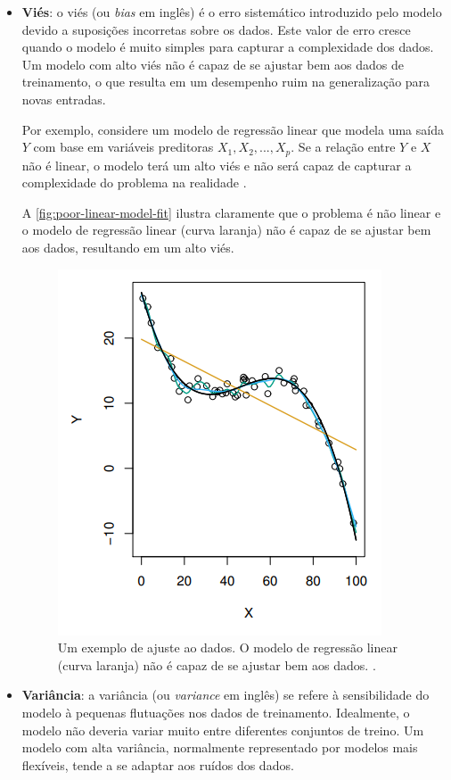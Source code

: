\begin{itemize}
    \item \textbf{Viés}: o viés (ou \textit{bias} em inglês) é o erro sistemático introduzido pelo modelo devido a suposições incorretas sobre os dados. Este valor de erro cresce quando o modelo é muito simples para capturar a complexidade dos dados. Um modelo com alto viés não é capaz de se ajustar bem aos dados de treinamento, o que resulta em um desempenho ruim na generalização para novas entradas.
    
    Por exemplo, considere um modelo de regressão linear que modela uma saída $Y$ com base em variáveis preditoras $X_1, X_2, ..., X_p$. Se a relação entre $Y$ e $X$ não é linear, o modelo terá um alto viés e não será capaz de capturar a complexidade do problema na realidade \citep{James2000}.
    
    A \autoref{fig:poor-linear-model-fit} ilustra claramente que o problema é não linear e o modelo de regressão linear (curva laranja) não é capaz de se ajustar bem aos dados, resultando em um alto viés.

    \begin{figure}[h]
        \centering
        \includegraphics[width=0.5\linewidth]{figs/poor-linear-model-fit.png}
        \caption{Um exemplo de ajuste ao dados. O modelo de regressão linear (curva laranja) não é capaz de se ajustar bem aos dados. \cite{James2000}.}
        \label{fig:poor-linear-model-fit}
    \end{figure}

    \item \textbf{Variância}: a variância (ou \textit{variance} em inglês) se refere à sensibilidade do modelo à pequenas flutuações nos dados de treinamento. Idealmente, o modelo não deveria variar muito entre diferentes conjuntos de treino. Um modelo com alta variância, normalmente representado por modelos mais flexíveis, tende a se adaptar aos ruídos dos dados.
    

\end{itemize}
